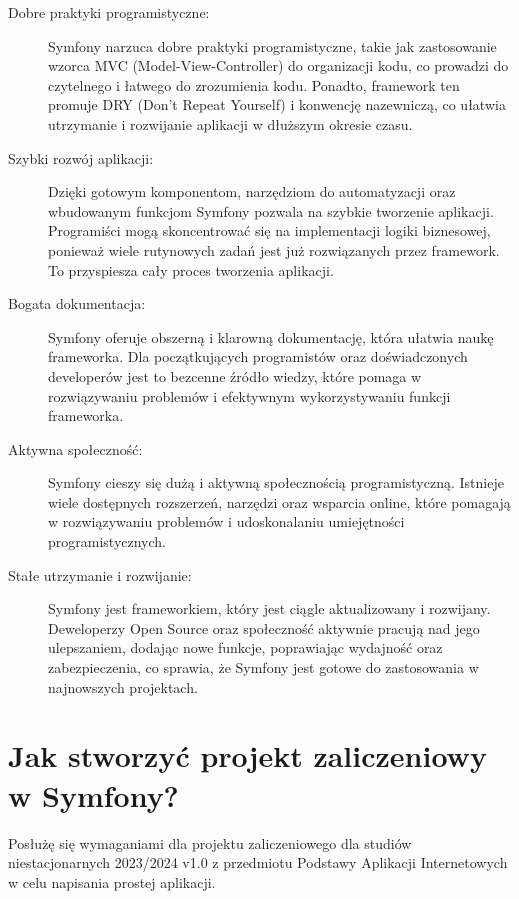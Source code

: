 \documentclass[polish, a4paper]{article}
\begin{document}
\begin{description}
    

\item[Dobre praktyki programistyczne:]{Symfony narzuca dobre praktyki programistyczne, takie jak zastosowanie wzorca MVC (Model-View-Controller) do organizacji kodu, co prowadzi do czytelnego i łatwego do zrozumienia kodu. Ponadto, framework ten promuje DRY (Don't Repeat Yourself) i konwencję nazewniczą, co ułatwia utrzymanie i rozwijanie aplikacji w dłuższym okresie czasu.}

\item[Szybki rozwój aplikacji:]{Dzięki gotowym komponentom, narzędziom do automatyzacji oraz wbudowanym funkcjom Symfony pozwala na szybkie tworzenie aplikacji. Programiści mogą skoncentrować się na implementacji logiki biznesowej, ponieważ wiele rutynowych zadań jest już rozwiązanych przez framework. To przyspiesza cały proces tworzenia aplikacji.}

\item[Bogata dokumentacja:]{ Symfony oferuje obszerną i klarowną dokumentację, która ułatwia naukę frameworka. Dla początkujących programistów oraz doświadczonych developerów jest to bezcenne źródło wiedzy, które pomaga w rozwiązywaniu problemów i efektywnym wykorzystywaniu funkcji frameworka.}

\item[Aktywna społeczność:]{Symfony cieszy się dużą i aktywną społecznością programistyczną. Istnieje wiele dostępnych rozszerzeń, narzędzi oraz wsparcia online, które pomagają w rozwiązywaniu problemów i udoskonalaniu umiejętności programistycznych.}

\item[Stałe utrzymanie i rozwijanie:]{ Symfony jest frameworkiem, który jest ciągle aktualizowany i rozwijany. Deweloperzy Open Source oraz społeczność aktywnie pracują nad jego ulepszaniem, dodając nowe funkcje, poprawiając wydajność oraz zabezpieczenia, co sprawia, że Symfony jest gotowe do zastosowania w najnowszych projektach.}

\end{description}

\section{Jak stworzyć projekt zaliczeniowy w Symfony?}

Posłużę się wymaganiami dla projektu zaliczeniowego dla studiów niestacjonarnych 2023/2024 v1.0 z przedmiotu Podstawy Aplikacji Internetowych w celu napisania prostej aplikacji.
\end{document}
